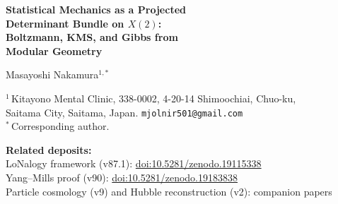 \documentclass[12pt]{article}
\theoremstyle{plain}
\theoremstyle{definition}
\numberwithin{equation}{section}
\newcommand{\HH}{\mathbb{H}}
\DeclareMathOperator{\Tr}{Tr}
\begin{document}
\begin{titlepage}
\centering
\vspace*{1cm}

{\LARGE\bfseries Statistical Mechanics as a Projected\\[6pt]
Determinant Bundle on $X(2)$:\\[6pt]
Boltzmann, KMS, and Gibbs from\\[6pt]
Modular Geometry}

\vspace{1.5cm}

{\large Masayoshi Nakamura$^{1,*}$}

\vspace{0.8cm}

{\normalsize
$^1$\,Kitayono Mental Clinic,
338-0002, 4-20-14 Shimoochiai, Chuo-ku,\\
Saitama City, Saitama, Japan.
\texttt{mjolnir501@gmail.com}\\[4pt]
$^*$\,Corresponding author.
}

\vspace{0.8cm}

{\small
\noindent\textbf{Related deposits:}\\
LoNalogy framework (v87.1): \href{https://doi.org/10.5281/zenodo.19115338}{doi:10.5281/zenodo.19115338}\\
Yang--Mills proof (v90): \href{https://doi.org/10.5281/zenodo.19183838}{doi:10.5281/zenodo.19183838}\\
Particle cosmology (v9) and Hubble reconstruction (v2): companion papers
}

\vspace{1.0cm}

\begin{abstract}
\noindent
We prove that every finite-volume Gibbs many-body system is exactly
representable as the first Fourier--holonomy mode of a determinant
bundle on the level-2 modular curve $X(2)=\Gamma(2)\backslash\HH$.
Concretely, for any quantum system $(\mathcal{H},H)$ with
$e^{-\beta H}$ trace class,
\[
\Tr_{\mathcal{H}}\,e^{-\beta H}
= \int_0^1 e^{-2\pi iu}\,
\det\nolimits_F\!\left(1+e^{2\pi iu}\,e^{-\beta H}\right)du,
\]
where the right-hand side is the $u$-projected LoNalogy determinant
fiber with $\beta=2\pi\tau_2$ and $Q=e^{-2\pi\tau_2}$.


\end{abstract}
\end{titlepage}
\end{document}
